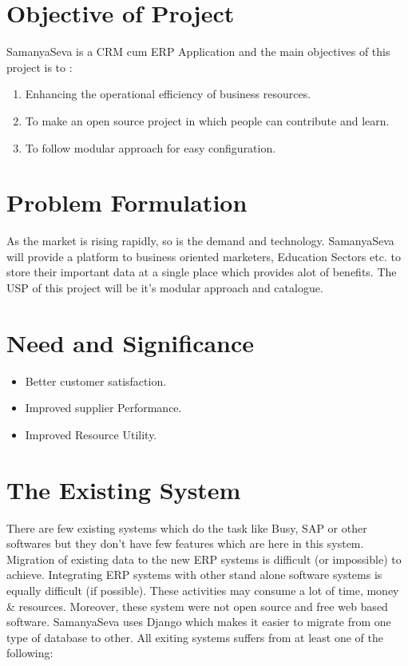 \section{Objective of Project}
SamanyaSeva is a CRM cum ERP Application and the 
main objectives of this project is to :
\begin{enumerate}
\item Enhancing the operational efficiency of business resources. 
\item To make an open source project in which people can contribute and learn.
\item To follow modular approach for easy configuration.
\end{enumerate}

\section{Problem Formulation}
As the market is rising rapidly, so is the demand and technology. SamanyaSeva will provide a platform to business oriented marketers, Education Sectors etc. to store their important data at a single place which provides alot of benefits. The USP of this project will be it's modular approach and catalogue.

\section{Need and Significance}
\begin{itemize}
\item Better customer satisfaction.
	\item Improved supplier Performance.
	\item Improved Resource Utility.
\end{itemize}

\section{The Existing System}
There are few existing systems which do the task like Busy, SAP or other softwares but
they don't have few features which are here in this system. Migration of existing data to the new ERP systems is difficult (or impossible) to achieve. Integrating ERP systems with other stand alone software systems is equally difficult (if possible). These activities may consume a lot of time, money \& resources. Moreover, these system were not open source and free web based software. SamanyaSeva uses Django which makes it easier to migrate from one type of database to other.
All exiting systems suffers from at least one of the following:
